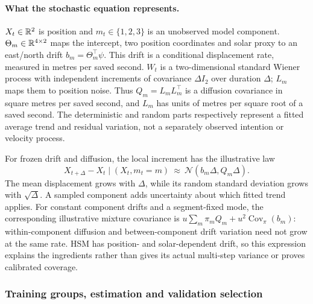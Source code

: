 \paragraph{What the stochastic equation represents.}
$X_t\in\mathbb{R}^2$ is position and $m_t\in\{1,2,3\}$ is an unobserved model
component. $\Theta_m\in\mathbb{R}^{4\times2}$ maps the intercept, two position
coordinates and solar proxy to an east/north drift $b_m=\Theta_m^\top\psi$.
This drift is a conditional displacement rate, measured in metres per
saved second. $W_t$ is a two-dimensional standard Wiener process with
independent increments of covariance $\Delta I_2$ over duration $\Delta$;
$L_m$ maps them to position noise. Thus $Q_m=L_mL_m^\top$ is a diffusion
covariance in square metres per saved second, and $L_m$ has units of
metres per square root of a saved second. The deterministic and random
parts respectively represent a fitted average trend and residual
variation, not a separately observed intention or velocity process.

For frozen drift and diffusion, the local increment has the illustrative law
\begin{equation}\label{eq:local-increment}
 X_{t+\Delta}-X_t\mid(X_t,m_t=m)
 \ \approx\ \mathcal N\!\left(b_m\Delta,Q_m\Delta\right).
\end{equation}
The mean displacement grows with $\Delta$, while its random standard
deviation grows with $\sqrt\Delta$. A sampled component adds uncertainty
about which fitted trend applies. For constant component drifts and a
segment-fixed mode, the corresponding illustrative mixture covariance is
$u\sum_m\pi_m Q_m+u^2\operatorname{Cov}_{\pi}(b_m)$: within-component
diffusion and between-component drift variation need not grow at the
same rate. HSM has position- and solar-dependent drift, so this expression
explains the ingredients rather than gives its actual multi-step variance
or proves calibrated coverage.

\subsubsection{Training groups, estimation and validation selection}\label{sec:training-methods}
